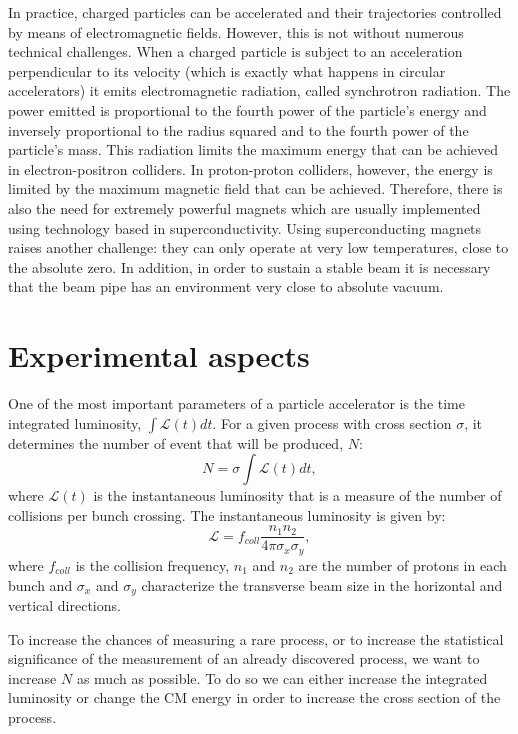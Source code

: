 In practice, charged particles can be accelerated and their trajectories controlled by means of electromagnetic fields. However, this is not without numerous technical challenges. When a charged particle is subject to an acceleration perpendicular to its velocity (which is exactly what happens in circular accelerators) it emits electromagnetic radiation, called synchrotron radiation. The power emitted is proportional to the fourth power of the particle's energy and inversely proportional to the radius squared and to the fourth power of the particle's mass. This radiation limits the maximum energy that can be achieved in electron-positron colliders. In proton-proton colliders, however, the energy is limited by the maximum magnetic field that can be achieved. Therefore, there is also the need for extremely powerful magnets which are usually implemented using technology based in superconductivity. Using superconducting magnets raises another challenge: they can only operate at very low temperatures, close to the absolute zero. In addition, in order to sustain a stable beam it is necessary that the beam pipe has an environment very close to absolute vacuum.   

\section{Experimental aspects}

One of the most important parameters of a particle accelerator is the time integrated luminosity, $\int \mathcal{L}(t) dt$. For a given process with cross section $\sigma$, it determines the number of event that will be produced, $N$:
\begin{equation}
N=\sigma \int \mathcal{L}(t) dt,
\label{eq:n_events}
\end{equation}
where $\mathcal{L}(t)$ is the instantaneous luminosity that is a measure of the number of collisions per bunch crossing.
The instantaneous luminosity is given by:
\begin{equation}
\mathcal{L}=f_{coll}\frac{n_1 n_2}{4\pi\sigma_x \sigma_y},
\label{eq:inst_lumi}
\end{equation}
where $f_{coll}$ is the collision frequency, $n_1$ and $n_2$ are the number of protons in each bunch and $\sigma_x$ and $\sigma_y$ characterize the transverse beam size in the horizontal and vertical directions.

To increase the chances of measuring a rare process, or to increase the statistical significance of the measurement of an already discovered process, we want to increase $N$ as much as possible. To do so we can either increase the integrated luminosity or change the CM energy in order to increase the cross section of the process. 

